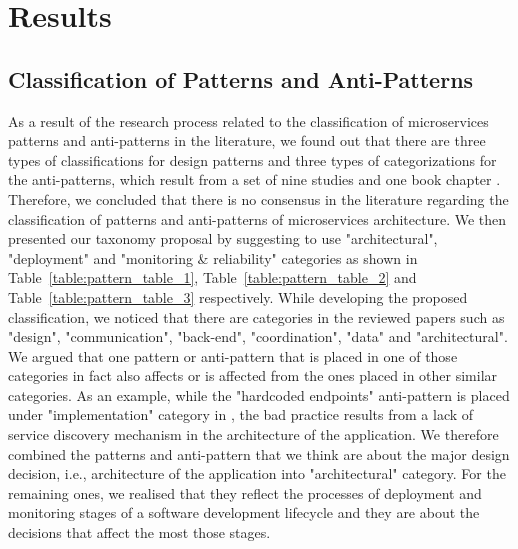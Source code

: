 \documentclass[11pt,a4paper,twocolumn]{article}
\begin{document}
\section{Results}
\label{sec:result}

\subsection{Classification of Patterns and Anti-Patterns}
\label{subsec:rq1}

As a result of the research process related to the classification of microservices patterns and anti-patterns in the literature, we found out that there are three types of classifications for design patterns and three types of categorizations for the anti-patterns, which result from a set of nine studies and one book chapter \cite{TaibiD2018APfM}\cite{KARABEYAKSAKALLI2021111014}\cite{valdivia}\cite{10.1145/3241403.3241429}\cite{8719492}\cite{9105640}\cite{Taibi2020}\cite{10.1145/3424771.3424812}\cite{8712355}\cite{9522227}. 
Therefore, we concluded that there is no consensus in the literature regarding the classification of patterns and anti-patterns of microservices architecture.
We then presented our taxonomy proposal by suggesting to use "architectural", "deployment" and "monitoring \& reliability" categories as shown in Table~\ref{table:pattern_table_1}, Table~\ref{table:pattern_table_2} and Table~\ref{table:pattern_table_3} respectively.
While developing the proposed classification, we noticed that there are categories in the reviewed papers such as "design", "communication", "back-end", "coordination", "data" and "architectural". We argued that one pattern or anti-pattern that is placed in one of those categories in fact also affects or is affected from the ones placed in other similar categories.
As an example, while the "hardcoded endpoints" anti-pattern is placed under "implementation" category in \cite{10.1145/3424771.3424812}, the bad practice results from a lack of service discovery mechanism in the architecture of the application.
We therefore combined the patterns and anti-pattern that we think are about the major design decision, i.e., architecture of the application into "architectural" category.
For the remaining ones, we realised that they reflect the processes of deployment and monitoring stages of a software development lifecycle and they are about the decisions that affect the most those stages.
\end{document}
